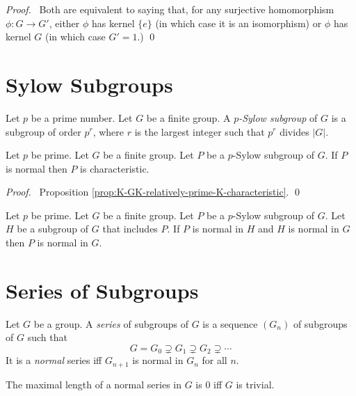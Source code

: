 \begin{proof}
\pf\ Both are equivalent to saying that, for any surjective homomorphism $\phi : G \rightarrow G'$, either $\phi$ has kernel $\{e\}$ (in which case it is an isomorphism) or $\phi$ has kernel $G$ (in which case $G' = 1$.) \qed
\end{proof}

\section{Sylow Subgroups}

\begin{df}
Let $p$ be a prime number. Let $G$ be a finite group. A \emph{$p$-Sylow subgroup} of $G$ is a subgroup of order $p^r$, where $r$ is the largest integer such that $p^r$ divides $|G|$.
\end{df}

\begin{prop}
Let $p$ be prime. Let $G$ be a finite group. Let $P$ be a $p$-Sylow subgroup of $G$. If $P$ is normal then $P$ is characteristic.
\end{prop}

\begin{proof}
\pf\ Proposition \ref{prop:K-GK-relatively-prime-K-characteristic}. \qed
\end{proof}

\begin{cor}
\label{cor:normal-normal-normal}
Let $p$ be prime. Let $G$ be a finite group. Let $P$ be a $p$-Sylow subgroup of $G$. Let $H$ be a subgroup of $G$ that includes $P$. If $P$ is normal in $H$ and $H$ is normal in $G$ then $P$ is normal in $G$.
\end{cor}

\section{Series of Subgroups}

\begin{df}
Let $G$ be a group. A \emph{series} of subgroups of $G$ is a sequence $(G_n)$ of subgroups of $G$ such that
\[ G = G_0 \supsetneq G_1 \supsetneq G_2 \supsetneq \cdots \]
It is a \emph{normal} series iff $G_{n+1}$ is normal in $G_n$ for all $n$.
\end{df}

\begin{prop}
The maximal length of a normal series in $G$ is 0 iff $G$ is trivial.
\end{prop}

